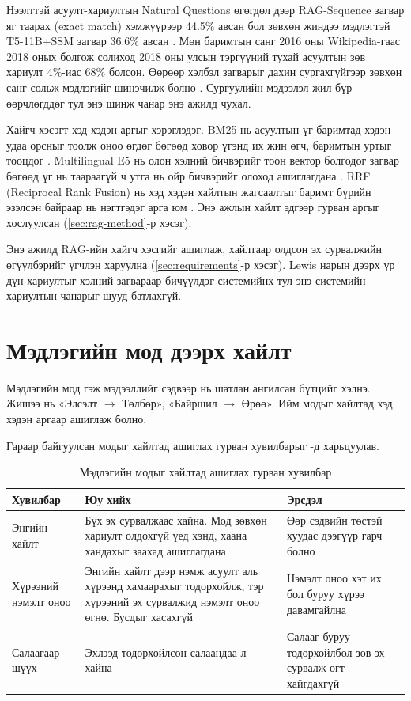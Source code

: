 Нээлттэй асуулт-хариултын Natural Questions өгөгдөл дээр RAG-Sequence загвар яг таарах (exact match) хэмжүүрээр 44.5\% авсан бол зөвхөн жиндээ мэдлэгтэй T5-11B+SSM загвар 36.6\% авсан \cite{lewis2020rag}. Мөн баримтын санг 2016 оны Wikipedia-гаас 2018 оных болгож солиход 2018 оны улсын тэргүүний тухай асуултын зөв хариулт 4\%-иас 68\% болсон. Өөрөөр хэлбэл загварыг дахин сургахгүйгээр зөвхөн санг сольж мэдлэгийг шинэчилж болно \cite{lewis2020rag}. Сургуулийн мэдээлэл жил бүр өөрчлөгддөг тул энэ шинж чанар энэ ажилд чухал.

Хайгч хэсэгт хэд хэдэн аргыг хэрэглэдэг. BM25 нь асуултын үг баримтад хэдэн удаа орсныг тоолж оноо өгдөг бөгөөд ховор үгэнд их жин өгч, баримтын уртыг тооцдог \cite{robertson2009bm25}. Multilingual E5 нь олон хэлний бичвэрийг тоон вектор болгодог загвар бөгөөд үг нь таараагүй ч утга нь ойр бичвэрийг олоход ашиглагдана \cite{wang2024me5}. \acs{RRF} (Reciprocal Rank Fusion) нь хэд хэдэн хайлтын жагсаалтыг баримт бүрийн эзэлсэн байраар нь нэгтгэдэг арга юм \cite{cormack2009rrf}. Энэ ажлын хайлт эдгээр гурван аргыг хослуулсан (\ref{sec:rag-method}-р хэсэг).

Энэ ажилд RAG-ийн хайгч хэсгийг ашиглаж, хайлтаар олдсон эх сурвалжийн өгүүлбэрийг үгчлэн харуулна (\ref{sec:requirements}-р хэсэг). Lewis нарын дээрх үр дүн хариултыг хэлний загвараар бичүүлдэг системийнх тул энэ системийн хариултын чанарыг шууд батлахгүй.


\section{Мэдлэгийн мод дээрх хайлт}
\label{sec:lit-tree}

Мэдлэгийн мод гэж мэдээллийг сэдвээр нь шатлан ангилсан бүтцийг хэлнэ. Жишээ нь «Элсэлт $\rightarrow$ Төлбөр», «Байршил $\rightarrow$ Өрөө». Ийм модыг хайлтад хэд хэдэн аргаар ашиглаж болно.


Гараар байгуулсан модыг хайлтад ашиглах гурван хувилбарыг -д харьцуулав.

\begin{table}[H]
\centering
\caption{Мэдлэгийн модыг хайлтад ашиглах гурван хувилбар}
\label{tab:tree_options}
\begin{tabular}{|p{2.6cm}|p{5.7cm}|p{5.3cm}|}
\hline
\textbf{Хувилбар} & \textbf{Юу хийх} & \textbf{Эрсдэл} \\
\hline
Энгийн хайлт & Бүх эх сурвалжаас хайна. Мод зөвхөн хариулт олдохгүй үед хэнд, хаана хандахыг заахад ашиглагдана & Өөр сэдвийн төстэй хуудас дээгүүр гарч болно \\
\hline
Хүрээний нэмэлт оноо & Энгийн хайлт дээр нэмж асуулт аль хүрээнд хамаарахыг тодорхойлж, тэр хүрээний эх сурвалжид нэмэлт оноо өгнө. Бусдыг хасахгүй & Нэмэлт оноо хэт их бол буруу хүрээ давамгайлна \\
\hline
Салаагаар шүүх & Эхлээд тодорхойлсон салаандаа л хайна & Салааг буруу тодорхойлбол зөв эх сурвалж огт хайгдахгүй \\
\hline
\end{tabular}
\end{table}

